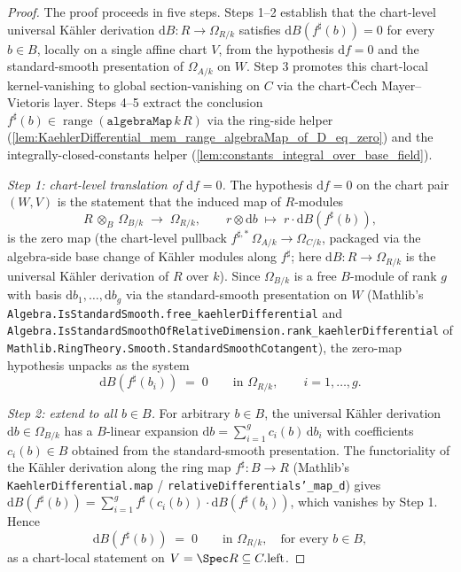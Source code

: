 \begin{proof}
  
  \leanok
  The proof proceeds in five steps. Steps 1--2 establish that the chart-level universal K\"ahler derivation \(\mathrm dB \colon R \to \Omega_{R/k}\) satisfies \(\mathrm dB(f^{\sharp}(b)) = 0\) for every \(b \in B\), locally on a single affine chart \(V\), from the hypothesis \(\mathrm df = 0\) and the standard-smooth presentation of \(\Omega_{A/k}\) on \(W\). Step 3 promotes this chart-local kernel-vanishing to global section-vanishing on \(C\) via the chart-\v Cech Mayer--Vietoris layer. Steps 4--5 extract the conclusion \(f^{\sharp}(b) \in \operatorname{range}(\mathtt{algebraMap}\,k\,R)\) via the ring-side helper (\cref{lem:KaehlerDifferential_mem_range_algebraMap_of_D_eq_zero}) and the integrally-closed-constants helper (\cref{lem:constants_integral_over_base_field}).

  \emph{Step 1: chart-level translation of \(\mathrm df = 0\).} The hypothesis \(\mathrm df = 0\) on the chart pair \((W, V)\) is the statement that the induced map of \(R\)-modules
  \[
    R \,\otimes_B\, \Omega_{B/k} \;\longrightarrow\; \Omega_{R/k}, \qquad r \otimes \mathrm db \;\mapsto\; r \cdot \mathrm dB(f^{\sharp}(b)),
  \]
  is the zero map (the chart-level pullback \(f^{\sharp,*}\,\Omega_{A/k} \to \Omega_{C/k}\), packaged via the algebra-side base change of K\"ahler modules along \(f^{\sharp}\); here \(\mathrm dB \colon R \to \Omega_{R/k}\) is the universal K\"ahler derivation of \(R\) over \(k\)). Since \(\Omega_{B/k}\) is a free \(B\)-module of rank \(g\) with basis \(\mathrm db_1, \ldots, \mathrm db_g\) via the standard-smooth presentation on \(W\) (Mathlib's \texttt{Algebra.IsStandardSmooth.free\_kaehlerDifferential} and \texttt{Algebra.IsStandardSmoothOfRelativeDimension.rank\_kaehlerDifferential} of \texttt{Mathlib.RingTheory.Smooth.StandardSmoothCotangent}), the zero-map hypothesis unpacks as the system
  \[
    \mathrm dB(f^{\sharp}(b_i)) \;=\; 0 \qquad \text{in } \Omega_{R/k}, \qquad i = 1, \ldots, g.
  \]

  \emph{Step 2: extend to all \(b \in B\).} For arbitrary \(b \in B\), the universal K\"ahler derivation \(\mathrm db \in \Omega_{B/k}\) has a \(B\)-linear expansion \(\mathrm db = \sum_{i=1}^{g} c_i(b)\, \mathrm db_i\) with coefficients \(c_i(b) \in B\) obtained from the standard-smooth presentation. The functoriality of the K\"ahler derivation along the ring map \(f^{\sharp} \colon B \to R\) (Mathlib's \texttt{KaehlerDifferential.map} / \texttt{relativeDifferentials'\_map\_d}) gives \(\mathrm dB(f^{\sharp}(b)) = \sum_{i=1}^{g} f^{\sharp}(c_i(b)) \cdot \mathrm dB(f^{\sharp}(b_i))\), which vanishes by Step 1. Hence
  \[
    \mathrm dB(f^{\sharp}(b)) \;=\; 0 \qquad \text{in } \Omega_{R/k}, \quad \text{for every } b \in B,
  \]
  as a chart-local statement on \(V = \Spec R \subseteq C.\mathrm{left}\).


\end{proof}
